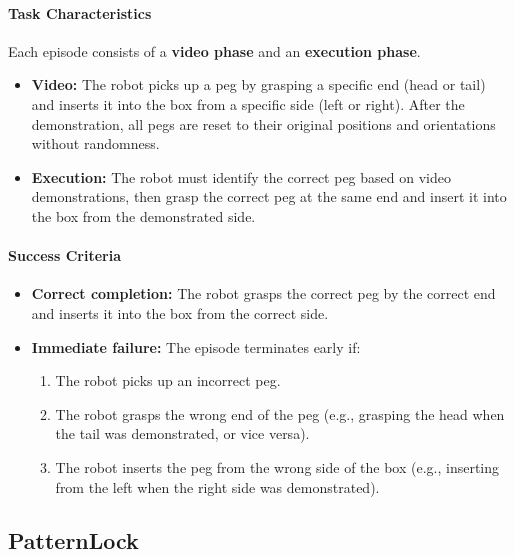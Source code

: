 \paragraph{Task Characteristics}
Each episode consists of a \textbf{video phase} and an \textbf{execution phase}.
\begin{itemize}[itemsep=1pt, topsep=0pt, leftmargin=*]
    \item \textbf{Video:} The robot picks up a peg by grasping a specific end (head or tail) and inserts it into the box from a specific side (left or right). After the demonstration, all pegs are reset to their original positions and orientations without randomness.
    \item \textbf{Execution:} The robot must identify the correct peg based on video demonstrations, then grasp the correct peg at the same end and insert it into the box from the demonstrated side.
\end{itemize}

\paragraph{Success Criteria}
\begin{itemize}[itemsep=1pt, topsep=0pt, leftmargin=*]
    \item \textbf{Correct completion:} The robot grasps the correct peg by the correct end and inserts it into the box from the correct side.
    \item \textbf{Immediate failure:} The episode terminates early if:
    \begin{enumerate}
        \item The robot picks up an incorrect peg.
        \item The robot grasps the wrong end of the peg (e.g., grasping the head when the tail was demonstrated, or vice versa).
        \item The robot inserts the peg from the wrong side of the box (e.g., inserting from the left when the right side was demonstrated).
    \end{enumerate}
\end{itemize}

\clearpage






\subsection{PatternLock}
\label{sec:task_patternlock}

